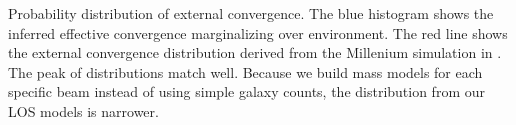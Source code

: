 \label{fig:suyu} Probability distribution of external convergence. The blue histogram shows the inferred effective convergence marginalizing over environment. The red line shows the external convergence distribution derived from the Millenium simulation in \citet{Suyu13}. The peak of distributions match well. Because we build mass models for each specific beam instead of using simple galaxy counts, the distribution from our LOS models is narrower.